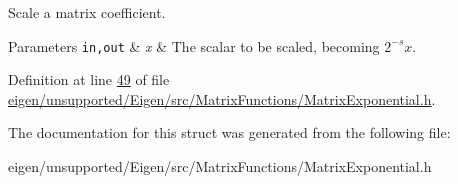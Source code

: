 Scale a matrix coefficient. 


\begin{DoxyParams}[1]{Parameters}
\mbox{\tt in,out}  & {\em x} & The scalar to be scaled, becoming $ 2^{-s} x $. \\
\hline
\end{DoxyParams}


Definition at line \hyperlink{eigen_2unsupported_2_eigen_2src_2_matrix_functions_2_matrix_exponential_8h_source_l00049}{49} of file \hyperlink{eigen_2unsupported_2_eigen_2src_2_matrix_functions_2_matrix_exponential_8h_source}{eigen/unsupported/\+Eigen/src/\+Matrix\+Functions/\+Matrix\+Exponential.\+h}.



The documentation for this struct was generated from the following file\+:\begin{DoxyCompactItemize}
\item 
eigen/unsupported/\+Eigen/src/\+Matrix\+Functions/\+Matrix\+Exponential.\+h\end{DoxyCompactItemize}
